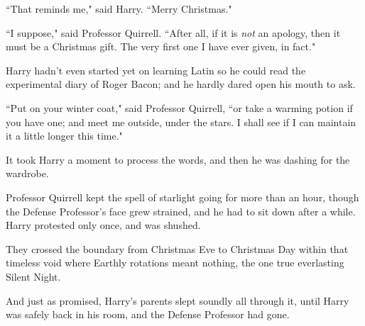 ``That reminds me," said Harry. ``Merry Christmas."

``I suppose," said Professor Quirrell. ``After all, if it is \emph{not} an apology, then it must be a Christmas gift. The very first one I have ever given, in fact."

Harry hadn't even started yet on learning Latin so he could read the experimental diary of Roger Bacon; and he hardly dared open his mouth to ask.

``Put on your winter coat," said Professor Quirrell, ``or take a warming potion if you have one; and meet me outside, under the stars. I shall see if I can maintain it a little longer this time."

It took Harry a moment to process the words, and then he was dashing for the wardrobe.

Professor Quirrell kept the spell of starlight going for more than an hour, though the Defense Professor's face grew strained, and he had to sit down after a while. Harry protested only once, and was shushed.

They crossed the boundary from Christmas Eve to Christmas Day within that timeless void where Earthly rotations meant nothing, the one true everlasting Silent Night.

And just as promised, Harry's parents slept soundly all through it, until Harry was safely back in his room, and the Defense Professor had gone.
